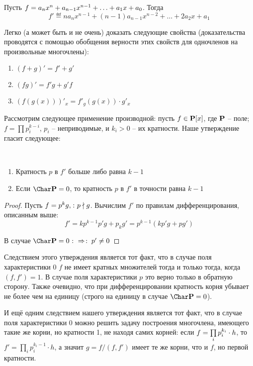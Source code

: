 Пусть $f=a_nx^n+a_{n-1}x^{n-1}\bw+\dots\bw+a_1x\bw+a_0$. Тогда
$$f'\eqdef na_nx^{n-1}+(n-1)a_{n-1}x^{n-2}+\dots+2a_2x+a_1$$

Легко (а может быть и не очень) доказать следующие свойства (доказательства проводятся с помощью обобщения верности этих свойств для одночленов на произвольные многочлены):

\begin{enumerate}
  \item $(f+g)'=f'+g'$
  \item $(fg)'=f'g+g'f$
  \item $(f(g(x)))'_x=f'_g(g(x))\cdot g'_x$
\end{enumerate}

Рассмотрим следующее применение производной: пусть $f\in\mathbf{P}[x]$, где $\mathbf{P}$ -- поле; $f=\prod\limits p_i^{k-i}$, $p_i$ -- неприводимые, и $k_i>0$ -- их кратности. Наше утверждение гласит следующее:
\begin{theorem}\par\strut\\
\begin{enumerate}
  \item Кратность $p$ в $f'$ больше либо равна $k-1$
  \item Если $\Char\Pb=0$, то кратность $p$ в $f'$ в точности равна $k-1$
\end{enumerate}
\end{theorem}
\begin{proof}
  Пусть $f=p^kg,\colon p\nmid g$. Вычислим $f'$ по правилам дифференцирования, описанным выше:
  $$f'=kp^{k-1}p'g+p_kg'=p^{k-1}(kp'g+pg')$$
  
  В случае $\Char\Pb=0\ra p'\ne0$
\end{proof}

Следствием этого утверждения является тот факт, что в случае поля характеристики 0 $f$ не имеет кратных множителей тогда и только тогда, когда $(f,f')=1$. В случае поля характеристики $p$ это верно только в обратную сторону. Также очевидно, что при дифференцировании кратность корня убывает не более чем на единицу (строго на единицу в случае $\Char\Pb=0$).

И ещё одним следствием нашего утверждения является тот факт, что в случае поля характеристики 0 можно решить задачу построения многочлена, имеющего такие же корни, но кратности 1, не находя самих корней: если $f\bw=\prod\limits_ip_i^{k_i}\cdot h$, то $f'=\prod\limits_ip_i^{k_i-1}\cdot h$, а значит $g=f/(f,f')$ имеет те же корни, что и $f$, но первой кратности.

